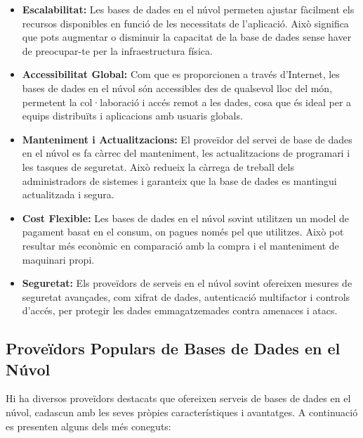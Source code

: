 \documentclass[a4paper,12pt,twoside]{ThesisStyle}
\begin{document}
\begin{itemize}
    \item \textbf{Escalabilitat:}
    Les bases de dades en el núvol permeten ajustar fàcilment els recursos disponibles en funció de les necessitats de l'aplicació. Això significa que pots augmentar o disminuir la capacitat de la base de dades sense haver de preocupar-te per la infraestructura física.
    
    \item \textbf{Accessibilitat Global:}
    Com que es proporcionen a través d'Internet, les bases de dades en el núvol són accessibles des de qualsevol lloc del món, permetent la col·laboració i accés remot a les dades, cosa que és ideal per a equips distribuïts i aplicacions amb usuaris globals.
    
    \item \textbf{Manteniment i Actualitzacions:}
    El proveïdor del servei de base de dades en el núvol es fa càrrec del manteniment, les actualitzacions de programari i les tasques de seguretat. Això redueix la càrrega de treball dels administradors de sistemes i garanteix que la base de dades es mantingui actualitzada i segura.
    
    \item \textbf{Cost Flexible:}
    Les bases de dades en el núvol sovint utilitzen un model de pagament basat en el consum, on pagues només pel que utilitzes. Això pot resultar més econòmic en comparació amb la compra i el manteniment de maquinari propi.
    
    \item \textbf{Seguretat:}
    Els proveïdors de serveis en el núvol sovint ofereixen mesures de seguretat avançades, com xifrat de dades, autenticació multifactor i controls d'accés, per protegir les dades emmagatzemades contra amenaces i atacs.
\end{itemize}


\subsection{Proveïdors Populars de Bases de Dades en el Núvol}
\label{subsec:Proveïdors Populars de Bases de Dades en el Núvol}

Hi ha diversos proveïdors destacats que ofereixen serveis de bases de dades en el núvol, cadascun amb les seves pròpies característiques i avantatges. A continuació es presenten alguns dels més coneguts:
\end{document}
